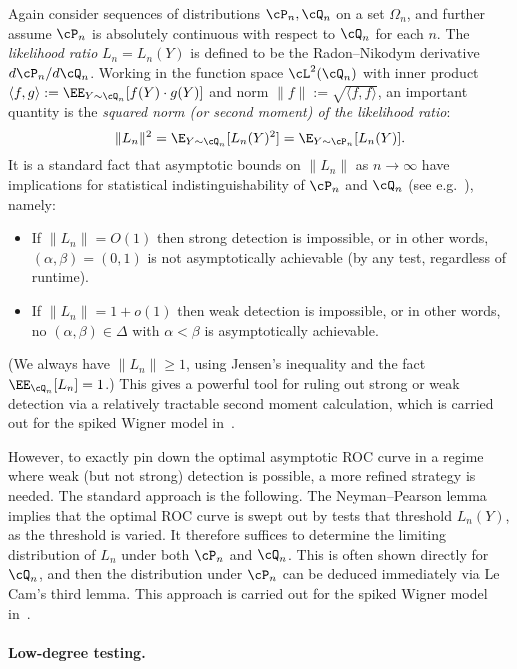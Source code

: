 \documentclass[11pt]{article}
\begin{document}
Again consider sequences of distributions $\cP_n,\cQ_n$ on a set $\Omega_n$, and further assume $\cP_n$ is absolutely continuous with respect to $\cQ_n$ for each $n$. The \emph{likelihood ratio} $L_n = L_n(Y)$ is defined to be the Radon--Nikodym derivative $d\cP_n/d\cQ_n$. Working in the function space $\cL^2(\cQ_n)$ with inner product $\langle f,g \rangle := \EE_{Y \sim \cQ_n}[f(Y) \cdot g(Y)]$ and norm $\|f\| := \sqrt{\langle f,f \rangle}$, an important quantity is the \emph{squared norm (or second moment) of the likelihood ratio}:
\[ \|L_n\|^2 = \E_{Y \sim \cQ_n} [L_n(Y)^2] = \E_{Y \sim \cP_n} [L_n(Y)]. \]
It is a standard fact that asymptotic bounds on $\|L_n\|$ as $n \to \infty$ have implications for statistical indistinguishability of $\cP_n$ and $\cQ_n$ (see e.g.~\cite[Lemma~2]{MRZ}), namely:
\begin{itemize}
    \item If $\|L_n\| = O(1)$ then strong detection is impossible, or in other words, $(\alpha,\beta) = (0,1)$ is not asymptotically achievable (by any test, regardless of runtime).
    \item If $\|L_n\| = 1+o(1)$ then weak detection is impossible, or in other words, no $(\alpha,\beta) \in \Delta$ with $\alpha < \beta$ is asymptotically achievable.
\end{itemize}
(We always have $\|L_n\| \ge 1$, using Jensen's inequality and the fact $\EE_{\cQ_n}[L_n] = 1$.) This gives a powerful tool for ruling out strong or weak detection via a relatively tractable second moment calculation, which is carried out for the spiked Wigner model in~\cite{MRZ,BMVVX,opt-subopt}.

However, to exactly pin down the optimal asymptotic ROC curve in a regime where weak (but not strong) detection is possible, a more refined strategy is needed. The standard approach is the following. The Neyman--Pearson lemma implies that the optimal ROC curve is swept out by tests that threshold $L_n(Y)$, as the threshold is varied. It therefore suffices to determine the limiting distribution of $L_n$ under both $\cP_n$ and $\cQ_n$. This is often shown directly for $\cQ_n$, and then the distribution under $\cP_n$ can be deduced immediately via Le Cam's third lemma. This approach is carried out for the spiked Wigner model in~\cite{fund-limits-wigner}.




\paragraph{Low-degree testing.}
\end{document}
